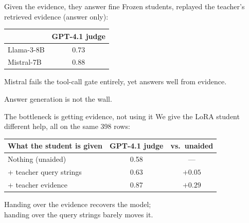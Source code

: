 \documentclass[10pt,aspectratio=169]{beamer}
\begin{document}
\begin{frame}{Given the evidence, they answer fine}
  Frozen students, replayed the teacher's \alert{retrieved evidence} (answer only):
  \vspace{0.8em}
  \begin{center}
    \begin{tabular}{lc}
      \toprule
      & GPT-4.1 judge \\
      \midrule
      Llama-3-8B & 0.73 \\
      Mistral-7B & 0.88 \\
      \bottomrule
    \end{tabular}
  \end{center}
  \vspace{0.8em}
  Mistral \alert{fails the tool-call gate entirely}, yet answers well from evidence.
  \smallskip

  \begin{center}\large Answer generation is \alert{not} the wall.\end{center}
\end{frame}

\begin{frame}{The bottleneck is getting evidence, not using it}
  We give the LoRA student different help, all on the \alert{same 398} rows:
  \vspace{1.1em}
  \begin{center}
  \begin{tabular}{lcc}
    \toprule
    \textbf{What the student is given} & \textbf{GPT-4.1 judge} & \textbf{vs.\ unaided} \\
    \midrule
    Nothing (unaided)        & 0.58 & --- \\
    \;+\; teacher query strings & 0.63 & $+0.05$ \\
    \;+\; teacher evidence      & \alert{0.87} & \alert{$+0.29$} \\
    \bottomrule
  \end{tabular}
  \end{center}
  \vspace{1.1em}
  \begin{center}
  Handing over the \alert{evidence} recovers the model;\\
  handing over the \alert{query strings} barely moves it.
  \end{center}
\end{frame}
\end{document}
